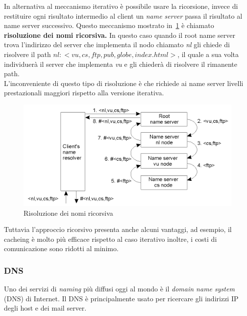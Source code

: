In alternativa al meccanismo iterativo è possibile usare la ricorsione, invece di restituire ogni risultato intermedio al client un \emph{name server} passa il risultato al name server successivo. Questo meccanismo mostrato in \figurename\,\ref{img:ricorsiva} è chiamato \textbf{risoluzione dei nomi ricorsiva.} In questo caso quando il root name server trova l'indirizzo del server che implementa il nodo chiamato \emph{nl} gli chiede di risolvere il path $nl:<vu,cs,ftp,pub,globe,index.html>$, il quale a sua volta individuerà il server che implementa \emph{vu} e gli chiederà di risolvere il rimanente path.\\
L'inconveniente di questo tipo di risoluzione è che richiede ai name server livelli prestazionali maggiori rispetto alla versione iterativa.
\begin{figure}[htb]
\centering
\includegraphics[scale=0.45]{img/ricorsiva.png}
\caption{Risoluzione dei nomi ricorsiva}\label{img:ricorsiva}
\end{figure}
Tuttavia l'approccio ricorsivo presenta anche alcuni vantaggi, ad esempio, il cacheing è molto più efficace rispetto al caso iterativo inoltre, i costi di comunicazione sono ridotti al minimo.
\subsubsection{DNS}
Uno dei servizi di \emph{naming} più diffusi oggi al mondo è il \emph{domain name system} (DNS) di Internet. Il DNS è principalmente usato per ricercare gli indirizzi IP degli host e dei mail server. 

